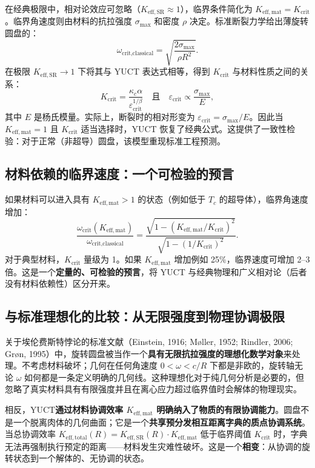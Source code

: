 \documentclass[12pt,a4paper]{article}
\newcommand{\kappac}{\kappa_c}
\newcommand{\betaf}{\beta}
\newcommand{\Keffmat}{K_{\mathrm{eff,mat}}}
\newcommand{\Kefftot}{K_{\mathrm{eff,total}}}
\newcommand{\KeffSR}{K_{\mathrm{eff,SR}}}
\newcommand{\Kcrit}{K_{\mathrm{crit}}}
\begin{document}
	在经典极限中，相对论效应可忽略（\(\KeffSR \approx 1\)），临界条件简化为 \(\Keffmat = \Kcrit\)。临界角速度则由材料的抗拉强度 \(\sigma_{\text{max}}\) 和密度 \(\rho\) 决定。标准断裂力学给出薄旋转圆盘的：
	\[
	\omega_{\text{crit,classical}} = \sqrt{\frac{2\sigma_{\text{max}}}{\rho R^2}}.
	\]
	在极限 \(\KeffSR \to 1\) 下将其与 YUCT 表达式相等，得到 \(\Kcrit\) 与材料性质之间的关系：
	\[
	\Kcrit = \frac{\kappac \alpha}{\varepsilon_{\text{crit}}^{1/\betaf}} \quad \text{且} \quad \varepsilon_{\text{crit}} \propto \frac{\sigma_{\text{max}}}{E},
	\]
	其中 \(E\) 是杨氏模量。实际上，断裂时的相对形变为 \(\varepsilon_{\text{crit}} = \sigma_{\text{max}}/E\)。因此当 \(\Keffmat = 1\) 且 \(\Kcrit\) 适当选择时，YUCT 恢复了经典公式。这提供了一致性检验：对于正常（非超导）圆盘，该模型重现标准工程预测。
	
	\subsection{材料依赖的临界速度：一个可检验的预言}
	
	如果材料可以进入具有 \(\Keffmat > 1\) 的状态（例如低于 \(T_c\) 的超导体），临界角速度增加：
	\[
	\frac{\omega_{\text{crit}}(K_{\mathrm{eff,mat}})}{\omega_{\text{crit,classical}}} = \frac{ \sqrt{1 - (\Keffmat/\Kcrit)^2} }{ \sqrt{1 - (1/\Kcrit)^2} }.
	\]
	对于典型材料，\(\Kcrit\) 量级为 1。如果 \(\Keffmat\) 增加例如 25\%，临界速度可增加 2–3 倍。这是一个\textbf{定量的、可检验的预言}，将 YUCT 与经典物理和广义相对论（后者没有材料依赖性）区分开来。
	
	\subsection{与标准理想化的比较：从无限强度到物理协调极限}
	
	关于埃伦费斯特悖论的标准文献（Einstein, 1916; Møller, 1952; Rindler, 2006; Grøn, 1995）中，旋转圆盘被当作一个\textbf{具有无限抗拉强度的理想化数学对象}来处理。不考虑材料破坏；几何在任何角速度 \(0 < \omega < c/R\) 下都是非欧的，旋转轴无论 \(\omega\) 如何都是一条定义明确的几何线。这种理想化对于纯几何分析是必要的，但忽略了真实材料具有有限强度并且在离心应力超过临界值时会解体的物理现实。
	
	相反，YUCT\textbf{通过材料协调效率 \(K_{\mathrm{eff,mat}}\) 明确纳入了物质的有限协调能力}。圆盘不是一个脱离肉体的几何曲面；它是一个\textbf{共享预分发相互距离字典的质点协调系统}。当总协调效率 \(\Kefftot(R) = \KeffSR(R) \cdot \Keffmat\) 低于临界阈值 \(\Kcrit\) 时，字典无法再强制执行预定的距离——材料发生灾难性破坏。这是一个\textbf{相变}：从协调的旋转状态到一个解体的、无协调的状态。
	
\end{document}
